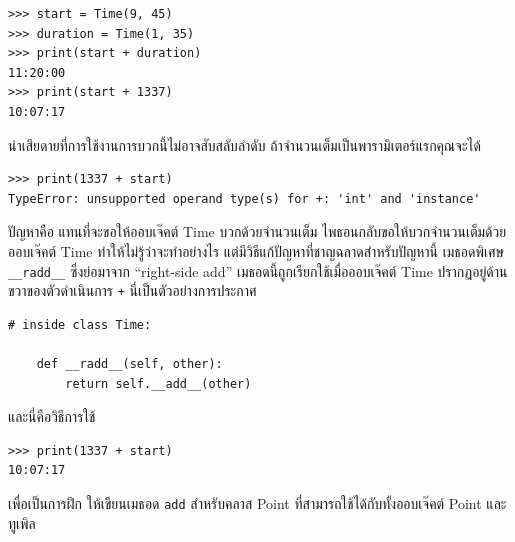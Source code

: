 \begin{verbatim}
>>> start = Time(9, 45)
>>> duration = Time(1, 35)
>>> print(start + duration)
11:20:00
>>> print(start + 1337)
10:07:17
\end{verbatim}
%

น่าเสียดายที่การใช้งานการบวกนี้ไม่อาจสับสลับลำดับ ถ้าจำนวนเต็มเป็นพารามิเตอร์แรกคุณจะได้

\begin{verbatim}
>>> print(1337 + start)
TypeError: unsupported operand type(s) for +: 'int' and 'instance'
\end{verbatim}
%

ปัญหาคือ แทนที่จะขอให้ออบเจ๊คต์ Time บวกด้วยจำนวนเต็ม  ไพธอนกลับขอให้บวกจำนวนเต็มด้วยออบเจ๊คต์ Time ทำให้ไม่รู้ว่าจะทำอย่างไร
แต่มีวิธีแก้ปัญหาที่ชาญฉลาดสำหรับปัญหานี้ เมธอดพิเศษ \verb"__radd__" ซึ่งย่อมาจาก ``right-side add'' 
เมธอดนี้ถูกเรียกใช้เมื่อออบเจ๊คต์ Time ปรากฏอยู่ด้านขวาของตัวดำเนินการ {\tt +} นี่เป็นตัวอย่างการประกาศ

\begin{verbatim}
# inside class Time:

    def __radd__(self, other):
        return self.__add__(other)
\end{verbatim}
%

และนี่คือวิธีการใช้

\begin{verbatim}
>>> print(1337 + start)
10:07:17
\end{verbatim}
%

เพื่อเป็นการฝึก ให้เขียนเมธอด {\tt add} สำหรับคลาส Point ที่สามารถใช้ได้กับทั้งออบเจ๊คต์ Point และทูเพิล

